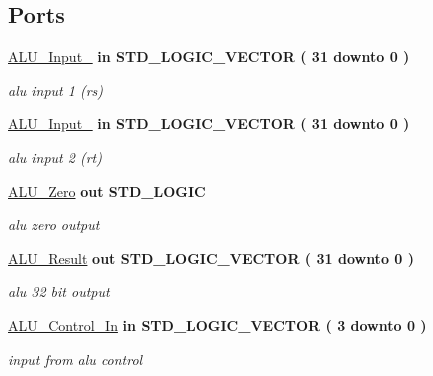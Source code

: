 \subsection*{\-Ports}
 \begin{DoxyCompactItemize}
\item 
\hypertarget{class_a_l_u_ad506dc3c4d5a49b33075dcf2ea057306}{\hyperlink{class_a_l_u_ad506dc3c4d5a49b33075dcf2ea057306}{\-A\-L\-U\-\_\-\-Input\-\_}  {\bfseries {\bfseries in }} {\bfseries \-S\-T\-D\-\_\-\-L\-O\-G\-I\-C\-\_\-\-V\-E\-C\-T\-O\-R (   31    downto    0  ) } }\label{class_a_l_u_ad506dc3c4d5a49b33075dcf2ea057306}

\begin{DoxyCompactList}\small\item\em alu input 1 (rs) \end{DoxyCompactList}\item 
\hypertarget{class_a_l_u_a657f38dca67063612c1c3d9327260efd}{\hyperlink{class_a_l_u_a657f38dca67063612c1c3d9327260efd}{\-A\-L\-U\-\_\-\-Input\-\_}  {\bfseries {\bfseries in }} {\bfseries \-S\-T\-D\-\_\-\-L\-O\-G\-I\-C\-\_\-\-V\-E\-C\-T\-O\-R (   31    downto    0  ) } }\label{class_a_l_u_a657f38dca67063612c1c3d9327260efd}

\begin{DoxyCompactList}\small\item\em alu input 2 (rt) \end{DoxyCompactList}\item 
\hypertarget{class_a_l_u_a15e59062cfee013b791bf90106bfe0a2}{\hyperlink{class_a_l_u_a15e59062cfee013b791bf90106bfe0a2}{\-A\-L\-U\-\_\-\-Zero}  {\bfseries {\bfseries out }} {\bfseries \-S\-T\-D\-\_\-\-L\-O\-G\-I\-C } }\label{class_a_l_u_a15e59062cfee013b791bf90106bfe0a2}

\begin{DoxyCompactList}\small\item\em alu zero output \end{DoxyCompactList}\item 
\hypertarget{class_a_l_u_a75eaa7827fe89e680e452286e5f64e93}{\hyperlink{class_a_l_u_a75eaa7827fe89e680e452286e5f64e93}{\-A\-L\-U\-\_\-\-Result}  {\bfseries {\bfseries out }} {\bfseries \-S\-T\-D\-\_\-\-L\-O\-G\-I\-C\-\_\-\-V\-E\-C\-T\-O\-R (   31    downto    0  ) } }\label{class_a_l_u_a75eaa7827fe89e680e452286e5f64e93}

\begin{DoxyCompactList}\small\item\em alu 32 bit output \end{DoxyCompactList}\item 
\hypertarget{class_a_l_u_a160e9acd866b7a383a28d77c159bd52a}{\hyperlink{class_a_l_u_a160e9acd866b7a383a28d77c159bd52a}{\-A\-L\-U\-\_\-\-Control\-\_\-\-In}  {\bfseries {\bfseries in }} {\bfseries \-S\-T\-D\-\_\-\-L\-O\-G\-I\-C\-\_\-\-V\-E\-C\-T\-O\-R (   3    downto    0  ) } }\label{class_a_l_u_a160e9acd866b7a383a28d77c159bd52a}

\begin{DoxyCompactList}\small\item\em input from alu control \end{DoxyCompactList}\end{DoxyCompactItemize}



